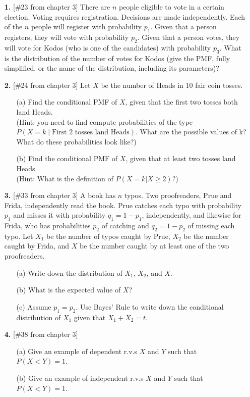 \documentclass{article}
\begin{document}
\begin{enumerate}
    \item[\textbf{1.}] [\#23 from chapter 3] There are $n$ people eligible to vote in a certain election. Voting requires registration. Decisions are made independently. Each of the $n$ people will register with probability $p_{1}$. Given that a person registers, they will vote with probability $p_{2}$. Given that a person votes, they will vote for Kodos (who is one of the candidates) with probability $p_{3}$. What is the distribution of the number of votes for Kodos (give the PMF, fully simplified, or the name of the distribution, including its parameters)?

    \item[\textbf{2.}] [\#24 from chapter 3] Let $X$ be the number of Heads in 10 fair coin tosses.
    \begin{enumerate}
        \item[(a)] Find the conditional PMF of $X$, given that the first two tosses both land Heads. \\
        (Hint: you need to find compute probabilities of the type $P(X=k \mid \text{First 2 tosses land Heads})$. What are the possible values of k? What do these probabilities look like?)
        \item[(b)] Find the conditional PMF of $X$, given that at least two tosses land Heads. \\
        (Hint: What is the definition of $P(X=k|X\ge2)$?)
    \end{enumerate}

    \item[\textbf{3.}] [\#33 from chapter 3] A book has $n$ typos. Two proofreaders, Prue and Frida, independently read the book. Prue catches each typo with probability $p_{1}$ and misses it with probability $q_{1}=1-p_{1}$, independently, and likewise for Frida, who has probabilities $p_{2}$ of catching and $q_{2}=1-p_{2}$ of missing each typo. Let $X_{1}$ be the number of typos caught by Prue, $X_{2}$ be the number caught by Frida, and $X$ be the number caught by at least one of the two proofreaders.
    \begin{enumerate}
        \item[(a)] Write down the distribution of $X_{1}$, $X_{2}$, and $X$.
        \item[(b)] What is the expected value of $X$?
        \item[(c)] Assume $p_{1}=p_{2}$. Use Bayes' Rule to write down the conditional distribution of $X_{1}$ given that $X_{1}+X_{2}=t$.
    \end{enumerate}
    
    \item[\textbf{4.}] [\#38 from chapter 3]
    \begin{enumerate}
        \item[(a)] Give an example of dependent r.v.s $X$ and $Y$ such that $P(X<Y)=1$.
        \item[(b)] Give an example of independent r.v.s $X$ and $Y$ such that $P(X<Y)=1$.
    \end{enumerate}
\end{enumerate}
\end{document}
